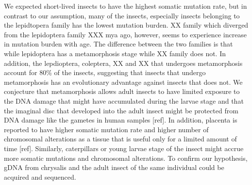We expected short-lived insects to have the highest somatic mutation rate, but in contrast to our assumption, many of the insects, especially insects belonging to the lepidtopera family has the lowest mutation burden. XX family which diverged from the lepidoptera family XXX mya ago, however, seems to experience increase in mutation burden with age. The difference between the two families is that while lepidoptera has a metamorphosis stage while XX family does not. In addition, the lepdioptera, coleptera, XX and XX that undergoes metamorphosis account for 80\% of the insects, suggesting that insects that undergo metamorphosis has an evolutionary advantage against insects that does not. We conjecture that metamorphosis allows adult insects to have limited exposure to the DNA damage that might have accumulated during the larvae stage and that the imaginal disc that developed into the adult insect might be protected from DNA damage like the gametes in human samples [ref]. In addition, placenta is reported to have higher somatic mutation rate and higher number of chromosomal alterations as a tissue that is useful only for a limited amount of time [ref]. Similarly, caterpillars or young larvae stage of the insect might accrue more somatic mutations and chromosomal alterations. To confirm our hypothesis, gDNA from chrysalis and the adult insect of the same individual could be acquired and sequenced. 



